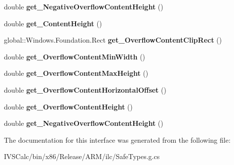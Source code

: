 \begin{DoxyCompactItemize}
double {\bfseries get\+\_\+\+Negative\+Overflow\+Content\+Height} ()
\item 
\mbox{\label{interface_windows_1_1_u_i_1_1_xaml_1_1_controls_1_1_primitives_1_1_i_command_bar_template_settings_a5810c6d2aea9d8b719fbbb6080bfa233}} 
double {\bfseries get\+\_\+\+Content\+Height} ()
\item 
\mbox{\label{interface_windows_1_1_u_i_1_1_xaml_1_1_controls_1_1_primitives_1_1_i_command_bar_template_settings_a0157d2e53d59a3f6e5143cee7703c287}} 
global\+::\+Windows.\+Foundation.\+Rect {\bfseries get\+\_\+\+Overflow\+Content\+Clip\+Rect} ()
\item 
\mbox{\label{interface_windows_1_1_u_i_1_1_xaml_1_1_controls_1_1_primitives_1_1_i_command_bar_template_settings_a574496afc738f6118a13262659f955bd}} 
double {\bfseries get\+\_\+\+Overflow\+Content\+Min\+Width} ()
\item 
\mbox{\label{interface_windows_1_1_u_i_1_1_xaml_1_1_controls_1_1_primitives_1_1_i_command_bar_template_settings_a039c68998d8208bcef982f4e641d3b0a}} 
double {\bfseries get\+\_\+\+Overflow\+Content\+Max\+Height} ()
\item 
\mbox{\label{interface_windows_1_1_u_i_1_1_xaml_1_1_controls_1_1_primitives_1_1_i_command_bar_template_settings_a5cb05fa9082964266b114eb582d6e518}} 
double {\bfseries get\+\_\+\+Overflow\+Content\+Horizontal\+Offset} ()
\item 
\mbox{\label{interface_windows_1_1_u_i_1_1_xaml_1_1_controls_1_1_primitives_1_1_i_command_bar_template_settings_a983fc5fc3d8c9299bf875f284cb82961}} 
double {\bfseries get\+\_\+\+Overflow\+Content\+Height} ()
\item 
\mbox{\label{interface_windows_1_1_u_i_1_1_xaml_1_1_controls_1_1_primitives_1_1_i_command_bar_template_settings_a911e48a12712a3ad58cf972749157729}} 
double {\bfseries get\+\_\+\+Negative\+Overflow\+Content\+Height} ()
\end{DoxyCompactItemize}


The documentation for this interface was generated from the following file\+:\begin{DoxyCompactItemize}
\item 
I\+V\+S\+Calc/bin/x86/\+Release/\+A\+R\+M/ilc/Safe\+Types.\+g.\+cs\end{DoxyCompactItemize}
